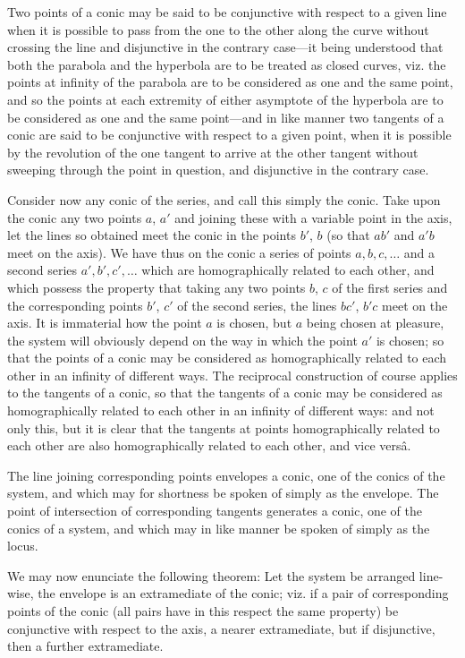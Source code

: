 \documentclass[11pt,a4paper]{article}
\theoremstyle{plain}
\begin{document}
Two points of a conic may be said to be conjunctive with respect to a given line when it is possible to pass from the one to the other along the curve without crossing the line and disjunctive in the contrary case---it being understood that both the parabola and the hyperbola are to be treated as closed curves, viz. the points at infinity of the parabola are to be considered as one and the same point, and so the points at each extremity of either asymptote of the hyperbola are to be considered as one and the same point---and in like manner two tangents of a conic are said to be conjunctive with respect to a given point, when it is possible by the revolution of the one tangent to arrive at the other tangent without sweeping through the point in question, and disjunctive in the contrary case.

Consider now any conic of the series, and call this simply the conic. Take upon the conic any two points $a$, $a'$ and joining these with a variable point in the axis, let the lines so obtained meet the conic in the points $b'$, $b$ (so that $ab'$ and $a'b$ meet on the axis). We have thus on the conic a series of points $a, b, c, \ldots$ and a second series $a', b', c', \ldots$ which are homographically related to each other, and which possess the property that taking any two points $b$, $c$ of the first series and the corresponding points $b'$, $c'$ of the second series, the lines $bc'$, $b'c$ meet on the axis. It is immaterial how the point $a$ is chosen, but $a$ being chosen at pleasure, the system will obviously depend on the way in which the point $a'$ is chosen; so that the points of a conic may be considered as homographically related to each other in an infinity of different ways. The reciprocal construction of course applies to the tangents of a conic, so that the tangents of a conic may be considered as homographically related to each other in an infinity of different ways: and not only this, but it is clear that the tangents at points homographically related to each other are also homographically related to each other, and vice vers\^{a}.

The line joining corresponding points envelopes a conic, one of the conics of the system, and which may for shortness be spoken of simply as the envelope. The point of intersection of corresponding tangents generates a conic, one of the conics of a system, and which may in like manner be spoken of simply as the locus.

We may now enunciate the following theorem: Let the system be arranged line-wise, the envelope is an extramediate of the conic; viz. if a pair of corresponding points of the conic (all pairs have in this respect the same property) be conjunctive with respect to the axis, a nearer extramediate, but if disjunctive, then a further extramediate.
\end{document}
